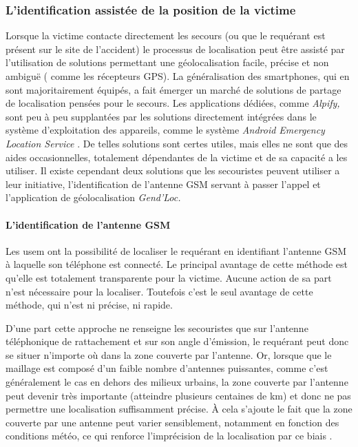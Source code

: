 \subsubsection{L'identification assistée de la position de la victime}
\label{subsec:1-1-2-2}

Lorsque la victime contacte directement les secours (ou que le
requérant est présent sur le site de l'accident) le processus de
localisation peut être assisté par l'utilisation de solutions
permettant une géolocalisation facile, précise et non ambiguë (\eg
comme les récepteurs GPS). La généralisation des smartphones, qui en
sont majoritairement équipés, a fait émerger un marché de solutions de
partage de localisation pensées pour le secours. Les applications
dédiées, comme \emph{Alpify,} sont peu à peu supplantées par les
solutions directement intégrées dans le système d'exploitation des
appareils, comme le système \emph{Android Emergency Location Service}
\autocite{Google2019}. De telles solutions sont certes utiles, mais
elles ne sont que des aides occasionnelles, totalement dépendantes de
la victime et de sa capacité a les utiliser. Il existe cependant deux
solutions que les secouristes peuvent utiliser a leur initiative,
l'identification de l'antenne GSM servant à passer l'appel et
l'application de géolocalisation \emph{Gend'Loc.}

\paragraph{L'identification de l'antenne GSM}

Les \ac{usem} ont la possibilité de localiser le requérant en
identifiant l'antenne GSM à laquelle son téléphone est connecté. Le
principal avantage de cette méthode est qu'elle est totalement
transparente pour la victime. Aucune action de sa part n'est
nécessaire pour la localiser. Toutefois c'est le seul avantage de
cette méthode, qui n'est ni précise, ni rapide.

D'une part cette approche ne renseigne les secouristes que sur
l'antenne téléphonique de rattachement et sur son angle d'émission, le
requérant peut donc se situer n'importe où dans la zone couverte par
l'antenne. Or, lorsque que le maillage est composé d'un faible nombre
d'antennes puissantes, comme c'est généralement le cas en dehors des
milieux urbains, la zone couverte par l'antenne peut devenir très
importante (\ie atteindre plusieurs centaines de km) et donc ne
pas permettre une localisation suffisamment précise. À cela s'ajoute
le fait que la zone couverte par une antenne peut varier sensiblement,
notamment en fonction des conditions météo, ce qui renforce
l'imprécision de la localisation par ce biais
\autocite{FenChong2012,OlteanuRaimond2012}.

